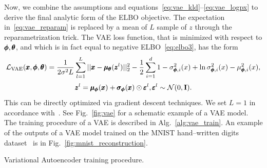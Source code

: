 Now, we combine the assumptions and equations~\eqref{eq:vae_kld}--\eqref{eq:vae_logpx} to derive the final analytic form of the ELBO objective. The expectation in~\eqref{eq:vae_reparam} is replaced by a mean of $L$ sample of $z$ through the reparametrization trick. The VAE loss function, that is minimized with respect to $\pmb{{\phi}}, \pmb{{\theta}}$, and which is in fact equal to negative ELBO~\eqref{eq:elbo3}, has the form
\begin{equation} \label{eq:vae_loss}
\mathcal{L_{\text{VAE}}}(\pmb{{x}},\pmb{{\phi}},\pmb{{\theta}})=\frac{1}{2\sigma^2 L}\sum_{l=1}^{L}||\pmb{{x}}-\pmb{{\mu}}_{\pmb{{\theta}}}(\pmb{{z}}^{l})||_{2}^{2} - \frac{1}{2}\sum_{i=1}^{d} 1-\sigma_{\pmb{{\phi}},i}^{2}(x)+\ln\sigma_{\pmb{{\phi}},i}^{2}(x)-\mu_{\pmb{{\phi}},i}^{2}(x),
\end{equation}
\begin{equation} 
\pmb{{z}}^l=\pmb{{\mu}}_{\pmb{{\phi}}}(\pmb{{x}})+\pmb{{\sigma}}_{\pmb{{\phi}}}(\pmb{{x}}) \odot \pmb{{\varepsilon}}^l, \pmb{{\varepsilon}}^l \sim  \mathcal{N}(0,\mathbf{I}). \nonumber
\end{equation}
This can be directly optimized via gradient descent techniques. We set $L=1$ in accordance with~\cite{kingma2013vae}. See Fig.~\ref{fig:vae} for a schematic example of a VAE model. The training procedure of a VAE is described in Alg.~\ref{alg:vae_train}. An example of the outputs of a VAE model trained on the MNIST hand--written digits dataset~\cite{lecun-mnisthandwrittendigit-2010} is in Fig.~\ref{fig:mnist_reconstruction}.

\begin{algorithm}
\caption{Variational Autoencoder training procedure.}
\label{alg:vae_train}
\end{algorithm}

